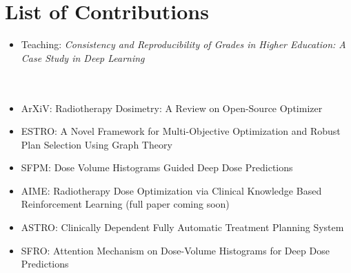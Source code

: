 \chapter*{List of Contributions}
\Large

\begin{itemize}
	\item Teaching: \textit{Consistency and Reproducibility of Grades in Higher Education: A Case Study in Deep Learning}\\\\\\
	\item ArXiV: Radiotherapy Dosimetry: A Review on Open-Source Optimizer
	\item ESTRO: A Novel Framework for Multi-Objective Optimization and Robust Plan Selection Using Graph Theory
	\item SFPM: Dose Volume Histograms Guided Deep Dose Predictions
	\item AIME: Radiotherapy Dose Optimization via Clinical Knowledge Based Reinforcement Learning (full paper coming soon)
	\item ASTRO: Clinically Dependent Fully Automatic Treatment Planning System
	\item SFRO: Attention Mechanism on Dose-Volume Histograms for Deep Dose Predictions
\end{itemize}

\normalsize